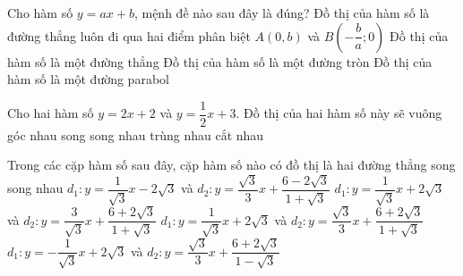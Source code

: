 \begin{ex}%
	Cho hàm số $y=ax+b$, mệnh đề nào sau đây là đúng?	
	\choice
	{Đồ thị của hàm số là đường thẳng luôn đi qua hai điểm phân biệt $A(0,b)$ và $B\left(-\dfrac{b}{a};0\right)$}
	{\True Đồ thị của hàm số là một đường thẳng}
	{Đồ thị của hàm số là một đường tròn}
	{Đồ thị của hàm số là một đường parabol}
\end{ex}
\begin{ex}%
	Cho hai hàm số $y=2x+2$ và $y=\dfrac{1}{2}x+3$. Đồ thị của hai hàm số này sẽ
	\choice
	{vuông góc nhau}
	{song song nhau}
	{trùng nhau}
	{\True cắt nhau}
\end{ex}
\begin{ex}%
	Trong các cặp hàm số sau đây, cặp hàm số nào có đồ thị là hai đường thẳng song song nhau
	\choice
	{\True $d_1:y=\dfrac{1}{\sqrt{3}}x-2\sqrt{3}$ và $d_2:y=\dfrac{\sqrt{3}}{3}x+\dfrac{6-2\sqrt{3}}{1+\sqrt{3}}$}
	{$d_1:y=\dfrac{1}{\sqrt{3}}x+2\sqrt{3}$ và $d_2:y=\dfrac{3}{\sqrt{3}}x+\dfrac{6+2\sqrt{3}}{1+\sqrt{3}}$}
	{ $d_1:y=\dfrac{1}{\sqrt{3}}x+2\sqrt{3}$ và $d_2:y=\dfrac{\sqrt{3}}{3}x+\dfrac{6+2\sqrt{3}}{1+\sqrt{3}}$}
	{$d_1:y=-\dfrac{1}{\sqrt{3}}x+2\sqrt{3}$ và $d_2:y=\dfrac{\sqrt{3}}{3}x+\dfrac{6+2\sqrt{3}}{1-\sqrt{3}}$}
\end{ex}



